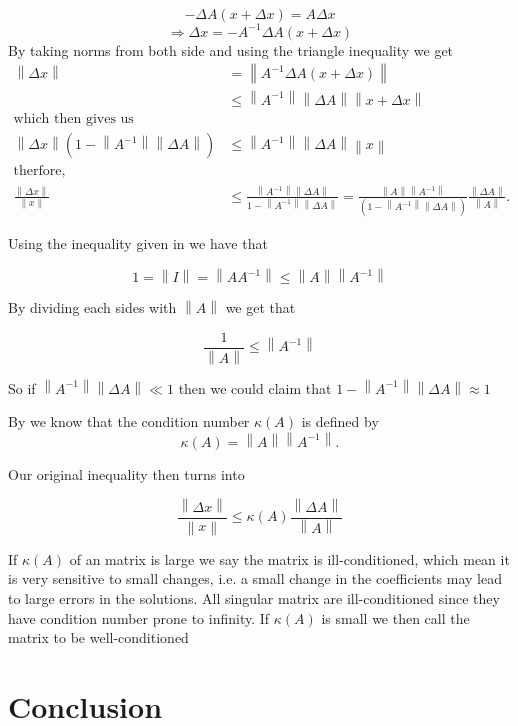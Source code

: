 \documentclass[12pt,reqno,twoside,titlepage]{article}
\theoremstyle{definition}
\newcommand{\norm}[1]{\left\lVert#1\right\rVert}
\begin{document}
$$-\Delta A(x+\Delta x)=A\Delta x$$
$$\Rightarrow \Delta x=-A^{-1}\Delta A(x+\Delta x)$$
By taking norms from both side and using the triangle inequality we get
\begin{align*}
\norm{\Delta x}&=\norm{A^{-1}\Delta A(x+\Delta x)}
\\ &\leq \norm{A^{-1}}\norm{\Delta A} \norm{x+ \Delta x}
\\\text{which then gives us}\\
\norm{\Delta x}(1-\norm{A^{-1}}\norm{\Delta A})&\leq\norm{A^{-1}}\norm{\Delta A}\norm{x}
\\\text{therfore,}\\
\frac{\norm{\Delta x}}{\norm{x}} &\leq\frac{\norm{A^{-1}}\norm{\Delta A}}{1-\norm{A^{-1}}\norm{\Delta A}}
=\frac{\norm{A}\norm{A^{-1}}}{(1-\norm{A^{-1}}\norm{\Delta A})}\frac{\norm{\Delta A}}{\norm{A}}.
\end{align*}

Using the inequality given in \cite{slq} we have that 

$$1=\norm{\textit{I}}=\norm{AA^{-1}}\leq \norm{A}\norm{A^{-1}}$$

By dividing each sides with $\norm{A}$ we get that

$$\frac{1}{\norm{A}}\leq \norm{A^{-1}}$$

So if $\norm{A^{-1}}\norm{\Delta A}\ll 1$ then we could claim that $1-\norm{A^{-1}}\norm{\Delta A}\approx 1$


By\cite{golub2012matrix} we know that the condition number $\kappa (A)$ is defined by
$$\kappa (A)=\norm{A}\norm{A^{-1}}.$$

Our original inequality then turns into

$$\frac{\norm{\Delta x}}{\norm{x}}\leq\kappa (A)\frac{\norm{\Delta A}}{\norm{A}}$$

If $\kappa(A)$ of an matrix is large we say the matrix is ill-conditioned\cite{ssls}, which mean it is very sensitive to small changes, i.e. a small change in the coefficients may lead to large errors in the solutions. All singular matrix are ill-conditioned since they have condition number prone to infinity.
If $\kappa (A)$ is small we then call the matrix to be well-conditioned\cite{ssls}

\section{Conclusion}


\end{document}
